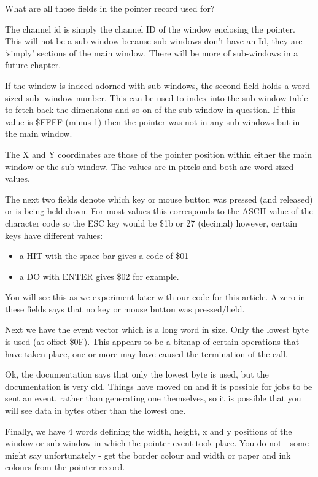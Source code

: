 What are all those fields in the pointer record used for?

The channel id is simply the channel ID of the window enclosing the pointer. This will not
be a sub-{}window because sub-{}windows don't have an Id, they are `simply' sections of the
main window. There will be more of sub-{}windows in a future chapter.

If the window is indeed adorned with sub-{}windows, the second field holds a word sized sub-{}
window number. This can be used to index into the sub-{}window table to fetch back the
dimensions and so on of the sub-{}window in question. If this value is \$FFFF (minus 1) then
the pointer was not in any sub-{}windows but in the main window.

The X and Y coordinates are those of the pointer position within either the main window
or the sub-{}window. The values are in pixels and both are word sized values.

The next two fields denote which key or mouse button was pressed (and released) or is
being held down. For most values this corresponds to the ASCII value of the character code
so the ESC key would be \$1b or 27 (decimal) however, certain keys have different
values:

\begin{itemize}[itemsep=0pt]

\item{}a HIT with the space bar gives a code of \$01

\item{}a DO with ENTER gives \$02 for example.

\end{itemize}

You will see this as we experiment later with our code for this article. A zero in these
fields says that no key or mouse button was pressed/held.

Next we have the event vector which is a long word in size. Only the lowest byte is used
(at offset \$0F). This appears to be a bitmap of certain operations that have taken place,
 one or more may have caused the termination of the  call.

Ok, the documentation says that only the lowest byte is used, but the documentation is 
very old. Things have moved on and it is possible for jobs to be sent an event, rather
than generating one themselves, so it is possible that you will see data in bytes other
than the lowest one.

Finally, we have 4 words defining the width, height, x and y positions of the window or
sub-{}window in which the pointer event took place. You do not -{} some might say 
unfortunately -{} get the border colour and width or paper and ink colours from the pointer
record.

